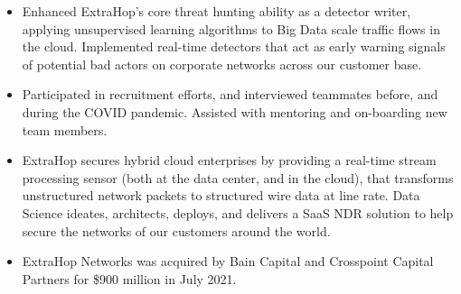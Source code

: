 \documentclass[10pt]{article}
\newcommand{\tabularxwidth}{\textwidth}
\begin{document}
\begin{minipage}{\tabularxwidth}
\begin{itemize}[noitemsep, topsep=3pt, parsep=0pt, partopsep=0pt]
                \item 
    Enhanced ExtraHop's core threat hunting ability as a detector writer, applying unsupervised learning algorithms to Big Data scale traffic flows in the cloud. Implemented real-time detectors that act as early warning signals of potential bad actors on corporate networks across our customer base.
            
                \item 
    Participated in recruitment efforts, and interviewed teammates before, and during the COVID pandemic. Assisted with mentoring and on-boarding new team members.
            
                \item 
    ExtraHop secures hybrid cloud enterprises by providing a real-time stream processing sensor (both at the data center, and in the cloud), that transforms unstructured network packets to structured wire data at line rate. Data Science ideates, architects, deploys, and delivers a SaaS NDR solution to help secure the networks of our customers around the world.
            
                \item 
    ExtraHop Networks was acquired by Bain Capital and Crosspoint Capital Partners for \$900 million in July 2021.
            
        \end{itemize}

        
            \vspace{.5em}
        

    \end{minipage}
    
\end{document}
